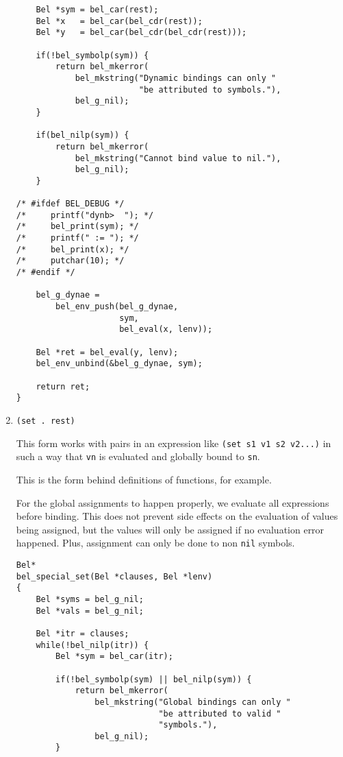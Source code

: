 \documentclass[openright,a4paper,twoside,12pt]{memoir}
\begin{document}
\begin{enumerate}
\begin{verbatim}
    Bel *sym = bel_car(rest);
    Bel *x   = bel_car(bel_cdr(rest));
    Bel *y   = bel_car(bel_cdr(bel_cdr(rest)));

    if(!bel_symbolp(sym)) {
        return bel_mkerror(
            bel_mkstring("Dynamic bindings can only "
                         "be attributed to symbols."),
            bel_g_nil);
    }

    if(bel_nilp(sym)) {
        return bel_mkerror(
            bel_mkstring("Cannot bind value to nil."),
            bel_g_nil);
    }

/* #ifdef BEL_DEBUG */
/*     printf("dynb>  "); */
/*     bel_print(sym); */
/*     printf(" := "); */
/*     bel_print(x); */
/*     putchar(10); */
/* #endif */
    
    bel_g_dynae =
        bel_env_push(bel_g_dynae,
                     sym,
                     bel_eval(x, lenv));

    Bel *ret = bel_eval(y, lenv);
    bel_env_unbind(&bel_g_dynae, sym);
    
    return ret;
}
\end{verbatim}

\item \texttt{(set . rest)}
\label{sec:org42efddf}

This form works with pairs in an expression like \texttt{(set s1 v1 s2
v2...)} in such a way that \texttt{vn} is evaluated and globally bound to \texttt{sn}.

This is the form behind definitions of functions, for example.

For the global assignments to happen properly, we evaluate all
expressions before binding. This does not prevent side effects on the
evaluation of values being assigned, but the values will only be
assigned if no evaluation error happened. Plus, assignment can only be
done to non \texttt{nil} symbols.

\begin{verbatim}
Bel*
bel_special_set(Bel *clauses, Bel *lenv)
{
    Bel *syms = bel_g_nil;
    Bel *vals = bel_g_nil;

    Bel *itr = clauses;
    while(!bel_nilp(itr)) {
        Bel *sym = bel_car(itr);

        if(!bel_symbolp(sym) || bel_nilp(sym)) {
            return bel_mkerror(
                bel_mkstring("Global bindings can only "
                             "be attributed to valid "
                             "symbols."),
                bel_g_nil);
        }
        

\end{verbatim}
\end{enumerate}
\end{document}
